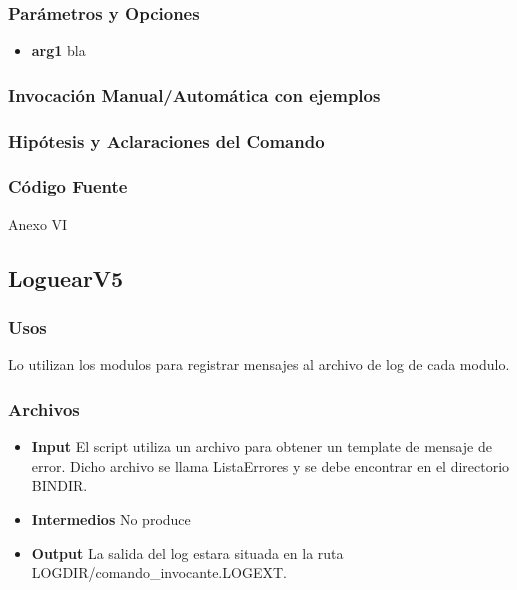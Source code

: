 \documentclass[a4paper,10pt,titlepage]{article}
\begin{document}
		\subsubsection{Par\'ametros y Opciones}
			\begin {itemize}
				\item \textbf{arg1} {bla}
			\end{itemize}
	
		\subsubsection{Invocaci\'on Manual/Autom\'atica con ejemplos}

		\subsubsection{Hip\'otesis y Aclaraciones del Comando}

		\subsubsection{C\'odigo Fuente}
			Anexo VI

	\subsection{LoguearV5}
		\subsubsection{Usos}

Lo utilizan los modulos para registrar mensajes al archivo de log de cada modulo.

		\subsubsection{Archivos}
			\begin {itemize}
				\item \textbf{Input} {El script utiliza un archivo para obtener un template de mensaje de error. Dicho archivo se llama ListaErrores y se debe encontrar en el directorio BINDIR.}
				\item \textbf{Intermedios} {No produce}
				\item \textbf{Output} {La salida del log estara situada en la ruta LOGDIR/comando_invocante.LOGEXT.}
			\end{itemize}
\end{document}
